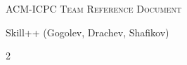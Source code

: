 \documentclass[a4paper]{article}
\begin{document}
\thispagestyle{fancy}

\begin{center}
	\Huge\textsc{ACM-ICPC Team Reference Document}

	\huge Skill++ (Gogolev, Drachev, Shafikov)

	\vspace{0.50cm}
\end{center}

\begin{multicols*}{2}
    \tableofcontents

    \setcounter{page}{1}
    
\end{multicols*}



%
%	
\end{document}
